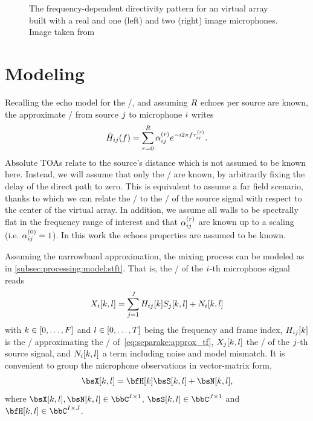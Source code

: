 \begin{figure}[b]
    \begin{fullwidth}
    \centering
    \resizebox{\linewidth}{!}{
        
    }
    \caption{The frequency-dependent directivity pattern for an virtual array built with a real and one (left) and two (right) image microphones.
    Image taken from }
    \label{fig:separake:directivity}
    \end{fullwidth}
\end{figure}

\section{Modeling}
Recalling the echo model for the \RIRs/, and assuming $R$ echoes per source are known, the approximate \RTFdef/ from source $j$ to microphone $i$ writes
\begin{equation}
    \label{eq:separake:approx_tf}
    \tilde{H}_{ij}(f) = \sum_{r=0}^{R} \alpha_{ij}^{(r)} {e}^{-{i} 2 \pi f \tau_{ij}^{(r)}}.
\end{equation}
Absolute \acsp{TOA} relate to the source's distance which is not assumed to be known here.
Instead, we will assume that only the \TDOAs/ are known, by arbitrarily fixing the delay of the direct path to zero.
This is equivalent to assume a far field scenario, thanks to which we can relate the \TDOAs/ to the \DOAsdef/ of the source signal with respect to the center of the virtual array.
In addition, we assume all walls to be spectrally flat in the frequency range of interest and that $\alpha_{ij}^{(r)}$ are known up to a scaling (i.e. $\alpha_{ij}^{(0)} = 1$).
In this work the echoes properties are assumed to be known.

\mynewline
Assuming the narrowband approximation, the mixing process can be modeled as in \cref{subsec:processing:model:stft}.
That is, the \STFTdef/ of the $i$-th microphone signal reads
\begin{equation}
    \label{eq:separake:stft}
    X_{i}[k,l] = \sum_{j = 1}^{J} H_{ij}[k] S_{j}[k,l] + N_{i}[k,l]
\end{equation}
with $k\in\klist{0,\ldots,F}$ and $l\in\klist{0,\ldots,T}$ being the frequency and frame index,
$H_{ij}[k]$ is the \DFT/ approximating the \RTF/ of~\eqref{eq:separake:approx_tf},
$X_{j}[k,l]$ the \STFT/ of the $j$-th source signal, and $N_{i}[k,l]$ a term including noise and model mismatch.
It is convenient to group the microphone observations in vector-matrix form,
\begin{equation}
    \MICS[k,l] = \FLTSS[k]\SRCS[k,l] + \NSES[k,l]
    ,
\end{equation}
where $\MICS[k,l],  \NSES[k,l] \in \bbC^{\numMics \times 1}$, $\SRCS[k,l] \in \bbC^{\numSrcs \times 1}$ and $\FLTSS[k,l] \in \bbC^{\numMics \times \numSrcs}$.

